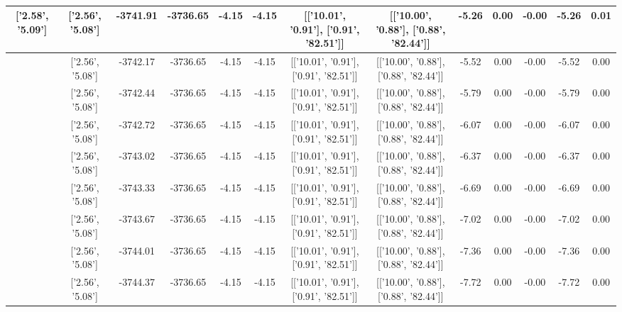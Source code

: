 \begin{table}[htbp]
\begin{adjustbox}{angle=90}
\begin{tabular}{|c|c|c|c|c|c|c|c|c|c|c|c|c|}
 ['2.58', '5.09'] & ['2.56', '5.08'] & -3741.91 & -3736.65 & -4.15 & -4.15 & [['10.01', '0.91'], ['0.91', '82.51']] & [['10.00', '0.88'], ['0.88', '82.44']] & -5.26 & 0.00 & -0.00 & -5.26 & 0.01\\ \hline
 ['2.58', '5.09'] & ['2.56', '5.08'] & -3742.17 & -3736.65 & -4.15 & -4.15 & [['10.01', '0.91'], ['0.91', '82.51']] & [['10.00', '0.88'], ['0.88', '82.44']] & -5.52 & 0.00 & -0.00 & -5.52 & 0.00\\ \hline
 ['2.59', '5.09'] & ['2.56', '5.08'] & -3742.44 & -3736.65 & -4.15 & -4.15 & [['10.01', '0.91'], ['0.91', '82.51']] & [['10.00', '0.88'], ['0.88', '82.44']] & -5.79 & 0.00 & -0.00 & -5.79 & 0.00\\ \hline
 ['2.59', '5.09'] & ['2.56', '5.08'] & -3742.72 & -3736.65 & -4.15 & -4.15 & [['10.01', '0.91'], ['0.91', '82.51']] & [['10.00', '0.88'], ['0.88', '82.44']] & -6.07 & 0.00 & -0.00 & -6.07 & 0.00\\ \hline
 ['2.59', '5.09'] & ['2.56', '5.08'] & -3743.02 & -3736.65 & -4.15 & -4.15 & [['10.01', '0.91'], ['0.91', '82.51']] & [['10.00', '0.88'], ['0.88', '82.44']] & -6.37 & 0.00 & -0.00 & -6.37 & 0.00\\ \hline
 ['2.59', '5.09'] & ['2.56', '5.08'] & -3743.33 & -3736.65 & -4.15 & -4.15 & [['10.01', '0.91'], ['0.91', '82.51']] & [['10.00', '0.88'], ['0.88', '82.44']] & -6.69 & 0.00 & -0.00 & -6.69 & 0.00\\ \hline
 ['2.59', '5.09'] & ['2.56', '5.08'] & -3743.67 & -3736.65 & -4.15 & -4.15 & [['10.01', '0.91'], ['0.91', '82.51']] & [['10.00', '0.88'], ['0.88', '82.44']] & -7.02 & 0.00 & -0.00 & -7.02 & 0.00\\ \hline
 ['2.59', '5.09'] & ['2.56', '5.08'] & -3744.01 & -3736.65 & -4.15 & -4.15 & [['10.01', '0.91'], ['0.91', '82.51']] & [['10.00', '0.88'], ['0.88', '82.44']] & -7.36 & 0.00 & -0.00 & -7.36 & 0.00\\ \hline
 ['2.59', '5.09'] & ['2.56', '5.08'] & -3744.37 & -3736.65 & -4.15 & -4.15 & [['10.01', '0.91'], ['0.91', '82.51']] & [['10.00', '0.88'], ['0.88', '82.44']] & -7.72 & 0.00 & -0.00 & -7.72 & 0.00\\ \hline
            \end{tabular}
        \end{adjustbox}
        \caption{}
        \label{}
    \end{table}
    